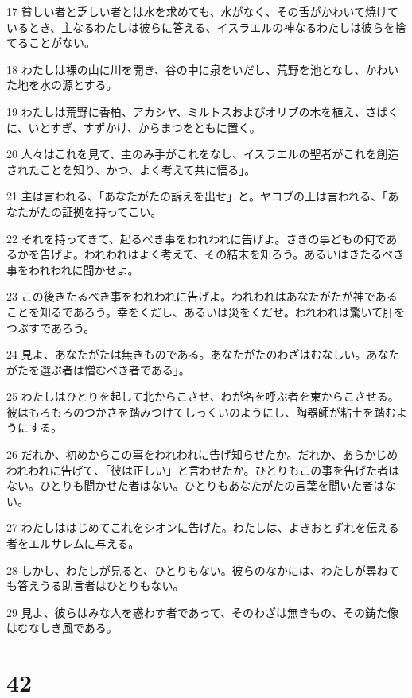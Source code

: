 \par 17 貧しい者と乏しい者とは水を求めても、水がなく、その舌がかわいて焼けているとき、主なるわたしは彼らに答える、イスラエルの神なるわたしは彼らを捨てることがない。
\par 18 わたしは裸の山に川を開き、谷の中に泉をいだし、荒野を池となし、かわいた地を水の源とする。
\par 19 わたしは荒野に香柏、アカシヤ、ミルトスおよびオリブの木を植え、さばくに、いとすぎ、すずかけ、からまつをともに置く。
\par 20 人々はこれを見て、主のみ手がこれをなし、イスラエルの聖者がこれを創造されたことを知り、かつ、よく考えて共に悟る」。
\par 21 主は言われる、「あなたがたの訴えを出せ」と。ヤコブの王は言われる、「あなたがたの証拠を持ってこい。
\par 22 それを持ってきて、起るべき事をわれわれに告げよ。さきの事どもの何であるかを告げよ。われわれはよく考えて、その結末を知ろう。あるいはきたるべき事をわれわれに聞かせよ。
\par 23 この後きたるべき事をわれわれに告げよ。われわれはあなたがたが神であることを知るであろう。幸をくだし、あるいは災をくだせ。われわれは驚いて肝をつぶすであろう。
\par 24 見よ、あなたがたは無きものである。あなたがたのわざはむなしい。あなたがたを選ぶ者は憎むべき者である」。
\par 25 わたしはひとりを起して北からこさせ、わが名を呼ぶ者を東からこさせる。彼はもろもろのつかさを踏みつけてしっくいのようにし、陶器師が粘土を踏むようにする。
\par 26 だれか、初めからこの事をわれわれに告げ知らせたか。だれか、あらかじめわれわれに告げて、「彼は正しい」と言わせたか。ひとりもこの事を告げた者はない。ひとりも聞かせた者はない。ひとりもあなたがたの言葉を聞いた者はない。
\par 27 わたしははじめてこれをシオンに告げた。わたしは、よきおとずれを伝える者をエルサレムに与える。
\par 28 しかし、わたしが見ると、ひとりもない。彼らのなかには、わたしが尋ねても答えうる助言者はひとりもない。
\par 29 見よ、彼らはみな人を惑わす者であって、そのわざは無きもの、その鋳た像はむなしき風である。

\chapter{42}

